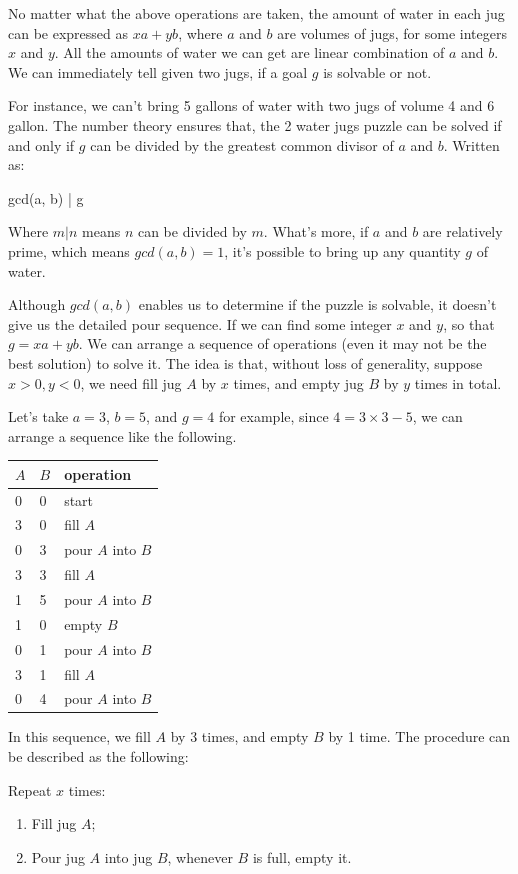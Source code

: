 \documentclass[UTF8]{article}
\begin{document}
No matter what the above operations are taken, the amount of water in
each jug can be expressed as $xa + yb$, where $a$ and $b$ are volumes
of jugs, for some integers $x$ and $y$. All the amounts of water we
can get are linear combination of $a$ and $b$. We can immediately
tell given two jugs, if a goal $g$ is solvable or not.

For instance, we can't bring 5 gallons of water with two jugs of volume
4 and 6 gallon. The number theory ensures that, the 2 water jugs puzzle
can be solved if and only if $g$ can be divided by the greatest common
divisor of $a$ and $b$. Written as:

\be
gcd(a, b) | g
\ee

Where $ m | n $ means $n$ can be divided by $m$. What's more, if $a$
and $b$ are relatively prime, which means $gcd(a, b) = 1$, it's possible
to bring up any quantity $g$ of water.

Although $gcd(a, b)$ enables us to determine if the puzzle is solvable, it
doesn't give us the detailed pour sequence. If we can find some integer
$x$ and $y$, so that $g = xa + yb$. We can arrange a sequence of operations
(even it may not be the best solution) to solve it. The idea is that,
without loss of generality, suppose $x > 0, y < 0$, we need fill jug $A$ by
$x$ times, and empty jug $B$ by $y$ times in total.

Let's take $a=3$, $b=5$, and $g=4$ for example, since $4 = 3 \times 3 - 5$,
we can arrange a sequence like the following.

\begin{tabular}{l|l|l}
$A$ & $B$ & operation \\
\hline
0 & 0 & start \\
3 & 0 & fill $A$ \\
0 & 3 & pour $A$ into $B$ \\
3 & 3 & fill $A$ \\
1 & 5 & pour $A$ into $B$ \\
1 & 0 & empty $B$ \\
0 & 1 & pour $A$ into $B$ \\
3 & 1 & fill $A$ \\
0 & 4 & pour $A$ into $B$ \\
\end{tabular}

In this sequence, we fill $A$ by 3 times, and empty $B$ by 1 time. The procedure
can be described as the following:

Repeat $x$ times:
\begin{enumerate}
\item Fill jug $A$;
\item Pour jug $A$ into jug $B$, whenever $B$ is full, empty it.
\end{enumerate}
\end{document}
